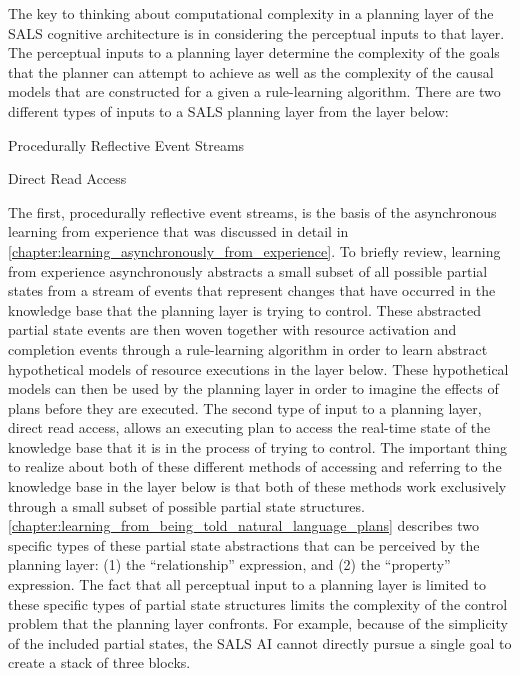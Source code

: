 The key to thinking about computational complexity in a planning layer
of the SALS cognitive architecture is in considering the perceptual
inputs to that layer.  The perceptual inputs to a planning layer
determine the complexity of the goals that the planner can attempt to
achieve as well as the complexity of the causal models that are
constructed for a given a rule-learning algorithm.  There are two
different types of inputs to a SALS planning layer from the layer
below:
\begin{packed_enumerate}
\item{Procedurally Reflective Event Streams}
\item{Direct Read Access}
\end{packed_enumerate}
The first, procedurally reflective event streams, is the basis of the
asynchronous learning from experience that was discussed in detail in
{\mbox{\autoref{chapter:learning_asynchronously_from_experience}}}.
To briefly review, learning from experience asynchronously abstracts a
small subset of all possible partial states from a stream of events
that represent changes that have occurred in the knowledge base that
the planning layer is trying to control.  These abstracted partial
state events are then woven together with resource activation and
completion events through a rule-learning algorithm in order to learn
abstract hypothetical models of resource executions in the layer
below.  These hypothetical models can then be used by the planning
layer in order to imagine the effects of plans before they are
executed.  The second type of input to a planning layer, direct read
access, allows an executing plan to access the real-time state of the
knowledge base that it is in the process of trying to control.  The
important thing to realize about both of these different methods of
accessing and referring to the knowledge base in the layer below is
that both of these methods work exclusively through a small subset of
possible partial state structures.
{\mbox{\autoref{chapter:learning_from_being_told_natural_language_plans}}}
describes two specific types of these partial state abstractions that
can be perceived by the planning layer: (1) the ``relationship''
expression, and (2) the ``property'' expression.  The fact that all
perceptual input to a planning layer is limited to these specific
types of partial state structures limits the complexity of the control
problem that the planning layer confronts.  For example, because of
the simplicity of the included partial states, the SALS AI cannot
directly pursue a single goal to create a stack of three blocks.
